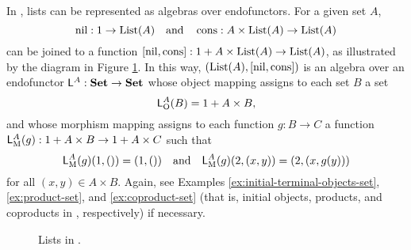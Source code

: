 \begin{example}
  \label{ex:algebra-list}


  In \set, lists can be represented as algebras over endofunctors. For
  a given set $A$,
  \begin{equation*}
    \operatorname{nil}: 1 \to \text{List}(A)
    \quad
    \text{and}
    \quad
    \operatorname{cons}: A \times \text{List}(A) \to \text{List}(A)
  \end{equation*}
  can be joined to a function $[\operatorname{nil},\operatorname{cons}]: 1 + A \times \text{List}(A)
  \to \text{List}(A)$, as illustrated by the diagram in Figure
  \ref{fig:coproduct-list}. In this way, $(\text{List}(A),[\operatorname{nil},\operatorname{cons}])$
  is an algebra over an endofunctor $\mathsf{L}^{A}: \mathbf{Set} \to \mathbf{Set}$
  whose object mapping assigns to each set $B$ a set
  \begin{equation*}
    \mathsf{L}_{\operatorname{O}}^{A}(B) = 1 + A \times B
    \text{,}
  \end{equation*}
  and whose morphism mapping assigns to each function $g: B \to C$ a
  function $\mathsf{L}_{\operatorname{M}}^{A}(g): 1 + A \times B \to 1 + A \times C$ such
  that
  \begin{equation*}
    \mathsf{L}_{\operatorname{M}}^{A}(g)(1,()) = (1,())
    \quad
    \text{and}
    \quad
    \mathsf{L}_{\operatorname{M}}^{A}(g)(2,(x,y)) = (2,(x,g(y)))
  \end{equation*}
  for all $(x,y) \in A \times B$. Again, see Examples
  \ref{ex:initial-terminal-objects-set}, \ref{ex:product-set}, and
  \ref{ex:coproduct-set} (that is, initial objects, products, and
  coproducts in \set, respectively) if necessary.

  \begin{figure}[htb]
    \begin{center}
    \end{center}
    \caption{Lists in \set.}
    \label{fig:coproduct-list}
  \end{figure}

\end{example}


